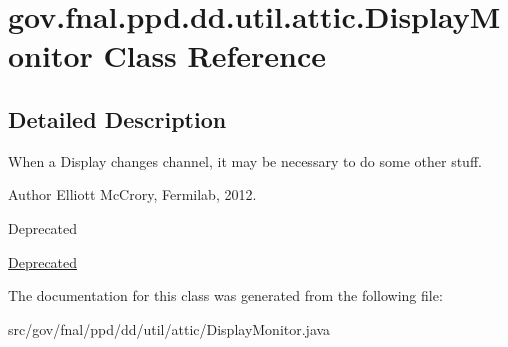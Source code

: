 \hypertarget{classgov_1_1fnal_1_1ppd_1_1dd_1_1util_1_1attic_1_1DisplayMonitor}{\section{gov.\-fnal.\-ppd.\-dd.\-util.\-attic.\-Display\-Monitor Class Reference}
\label{classgov_1_1fnal_1_1ppd_1_1dd_1_1util_1_1attic_1_1DisplayMonitor}
}


\subsection{Detailed Description}
When a Display changes channel, it may be necessary to do some other stuff.

\begin{DoxyAuthor}{Author}
Elliott Mc\-Crory, Fermilab, 2012. 
\end{DoxyAuthor}
\begin{DoxyRefDesc}{Deprecated}
\item[\hyperlink{deprecated__deprecated000011}{Deprecated}]\end{DoxyRefDesc}


The documentation for this class was generated from the following file\-:\begin{DoxyCompactItemize}
\item 
src/gov/fnal/ppd/dd/util/attic/Display\-Monitor.\-java\end{DoxyCompactItemize}
